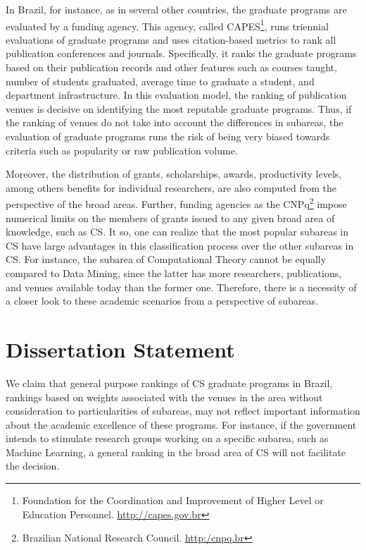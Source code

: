 \documentclass[msc]{ppgccufmg}
\begin{document}
In Brazil, for instance, as in several other countries, the graduate programs are evaluated by a funding agency. This agency, called CAPES\footnote{Foundation for the Coordination and Improvement of Higher Level or Education Personnel. \url{http://capes.gov.br}}, runs triennial evaluations of graduate programs and uses citation-based metrics to rank all publication conferences and journals. Specifically, it ranks the graduate programs based on their publication records and other features such as courses taught, number of students graduated, average time to graduate a student, and department infrastructure. In this evaluation model, the ranking of publication venues is decisive on identifying the most reputable graduate programs. Thus, if the ranking of venues do not take into account the differences in subareas, the evaluation of graduate programs runs the risk of being very biased towards criteria such as popularity or raw publication volume.

Moreover, the distribution of grants, scholarships, awards, productivity levels, among others benefits for individual researchers, are also computed from the perspective of the broad areas. Further, funding agencies as the CNPq\footnote{Brazilian National Research Council. \url{http:/cnpq.br}} impose numerical limits on the members of grants issued to any given broad area of knowledge, such as CS. It so, one can realize that the most popular subareas in CS have large advantages in this classification process over the other subareas in CS. For instance, the subarea of Computational Theory cannot be equally compared to Data Mining, since the latter has more researchers, publications, and venues available today than the former one. Therefore, there is a necessity of a closer look to these academic scenarios from a perspective of subareas.
%
%

\section{Dissertation Statement}

We claim that general purpose rankings of CS graduate programs in Brazil, rankings based on weights associated with the venues in the area without consideration to particularities of subareas, may not reflect important information about the academic excellence of these programs. For instance, if the government intends to stimulate research groups working on a specific subarea, such as Machine Learning, a general ranking in the broad area of CS will not facilitate the decision. 
\end{document}
